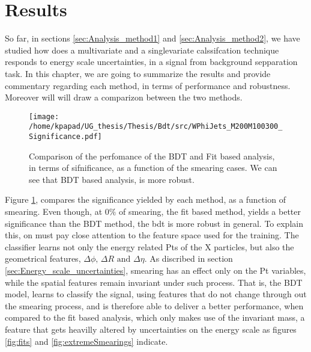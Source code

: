 \section{Results}
\label{sec:org28f7420}
So far, in sections \ref{sec:Analysis_method1} and \ref{sec:Analysis_method2}, we have studied how does a multivariate and a singlevariate calssifcation technique responds to energy scale uncertainties, in a signal from background sepparation task. In this chapter, we are going to summarize the results and provide commentary regarding each method, in terms of performance and robustness. Moreover will will draw a comparizon between the two methods.

\begin{figure}[htbp]
\centering
\texttt{[image: /home/kpapad/UG\_thesis/Thesis/Bdt/src/WPhiJets\_M200M100300\_Significance.pdf]}
\caption{ Comparison of the perfomance of the BDT and Fit based analysis, in terms of sifnificance,  as a function of the smearing cases. We can see that BDT based analysis, is more robust.}
\label{fig:BdtFitSig}
\end{figure}

Figure \ref{fig:BdtFitSig}, compares the significance yielded by each method, as a function of smearing. 
Even though, at \(0\%\) of smearing, the fit based method, yields a better significance than the BDT method, the bdt is more robust in general. To explain this, on must pay close attention to the feature space used for the training. The classifier learns not only the energy related Pts of the X particles, but also the geometrical features, \(\Delta\phi\text{, }\Delta R\text{ and }\Delta\eta\). As discribed in section \ref{sec:Energy_scale_uncertainties}, smearing has an effect only on the Pt variables, while the spatial features remain invariant under such process. That is, the BDT model, learns to classify the signal, using features that do not change through out the smearing process, and is therefore able to deliver a better performance, when compared to the fit based analysis, which only makes use of the invariant mass, a feature that gets heavilly altered by uncertainties on the energy scale as figures \ref{fig:fits} and \ref{fig:extremeSmearings} indicate. 

